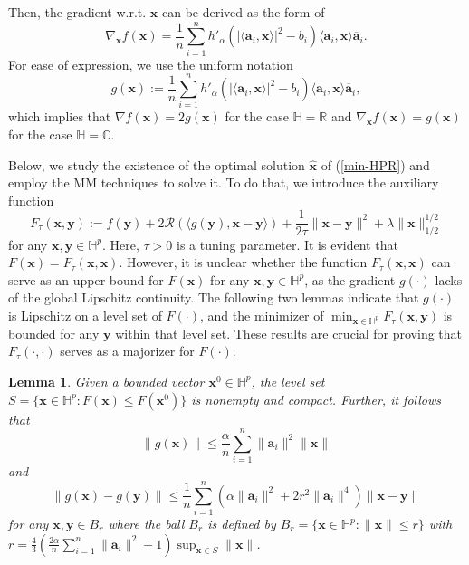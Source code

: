 \documentclass{article}
\newtheorem{lemma}[theorem]{Lemma}
\numberwithin{equation}{section}
\begin{document}
Then, the gradient w.r.t. $\mathbf{x}$ can be derived as the form of
\begin{equation}
\nabla_{\mathbf{x}} f(\mathbf{x})=\frac{1}{n}\sum\limits_{i=1}^n h'_{\alpha}(|\langle \mathbf{a}_i, \mathbf{x}\rangle|^2-b_i)\langle \mathbf{a}_i, \mathbf{x}\rangle \overline{\mathbf{a}}_i.\nonumber
\end{equation}
For ease of expression, we use the uniform notation
\begin{equation}
g(\mathbf{x}):=\frac{1}{n}\sum\limits_{i=1}^n h'_{\alpha}(|\langle \mathbf{a}_i, \mathbf{x}\rangle|^2-b_i)\langle \mathbf{a}_i, \mathbf{x}\rangle \overline{\mathbf{a}}_i,\nonumber
\end{equation}
which implies that $\nabla f(\mathbf{x})=2g(\mathbf{x})$ for the case $\mathbb{H}=\mathbb{R}$ and $\nabla_{\mathbf{x}} f(\mathbf{x})=g(\mathbf{x})$
for the case $\mathbb{H}=\mathbb{C}$.


Below, we study the existence of the optimal solution $\hat{\mathbf{x}}$ of (\ref{min-HPR}) and employ the MM  techniques to solve it. To do that, we introduce the auxiliary function
\begin{equation}
F_\tau(\mathbf{x},\mathbf{y}):=f(\mathbf{y})+2\mathcal{R}(\langle g(\mathbf{y}),\mathbf{x}-\mathbf{y}\rangle) +\frac{1}{2\tau}\|\mathbf{x}-\mathbf{y}\|^2+\lambda\|\mathbf{x}\|_{1/2}^{1/2}\nonumber
\end{equation}
for any $\mathbf{x},\mathbf{y}\in \mathbb{H}^p$. Here, $\tau>0$ is a tuning parameter. It is evident that $F(\mathbf{x})=F_{\tau}(\mathbf{x},\mathbf{x})$. However, it is unclear whether the function $F_{\tau}(\mathbf{x},\mathbf{x})$ can serve as an upper bound for $F(\mathbf{x})$ for any $\mathbf{x},\mathbf{y}\in\mathbb{H}^p$, as the gradient $g(\cdot)$ lacks of the global Lipschitz continuity. The following two lemmas indicate that $g(\cdot)$ is Lipschitz on a level set of $F(\cdot)$, and the minimizer of $\min_{\mathbf{x}\in\mathbb{H}^p} F_\tau(\mathbf{x},\mathbf{y})$  is bounded for any $\mathbf{y}$ within that level set. These results are crucial for proving that $F_\tau(\cdot,\cdot)$ serves as a majorizer for $F(\cdot)$.


	\begin{lemma}\label{g-prop}  Given a bounded vector $\mathbf{x}^0\in\mathbb{H}^p$, the level set $S=\{\mathbf{x}\in\mathbb{H}^p: F(\mathbf{x})\leq F(\mathbf{x}^0)\}$ is nonempty and  compact. Further, it follows that
\begin{equation}\label{g-bound}
		\|g(\mathbf{x})\|\leq\frac{\alpha}{n}\sum_{i=1}^n\|\mathbf{a}_i\|^2\|\mathbf{x}\|
	\end{equation}
	and
	\begin{equation}\label{g-Lip}
		\|g(\mathbf{x})-g(\mathbf{y})\|\leq\frac{1}{n}\sum\limits_{i=1}^n (\alpha\|\mathbf{a}_i\|^2+2r^2\|\mathbf{a}_i\|^4)\|\mathbf{x}-\mathbf{y}\|
	\end{equation}
	for any $\mathbf{x},\mathbf{y}\in B_r$ where the ball
	$B_r$ is defined by $B_r=\{\mathbf{x}\in\mathbb{H}^p: \|\mathbf{x}\|\leq r\}$ with $r=\frac{4}{3}(\frac{2\alpha}{n}\sum_{i=1}^n\|\mathbf{a}_i\|^2+1)
	\sup_{\mathbf{x}\in S}\|\mathbf{x}\|$.
\end{lemma}
\end{document}

